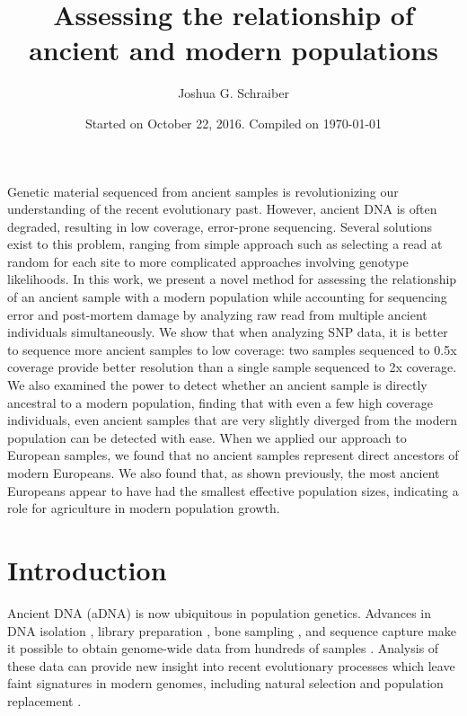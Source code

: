 \documentclass[11pt, oneside]{article}   	%
\title{Assessing the relationship of ancient and modern populations}
\author{Joshua G. Schraiber}
\date{Started on October 22, 2016. Compiled on \today}							%
\begin{document}
\maketitle

\abstract
Genetic material sequenced from ancient samples is revolutionizing our understanding of the recent evolutionary past. However, ancient DNA is often degraded, resulting in low coverage, error-prone sequencing. Several solutions exist to this problem, ranging from simple approach such as selecting a read at random for each site to more complicated approaches involving genotype likelihoods. In this work, we present a novel method for assessing the relationship of an ancient sample with a modern population while accounting for sequencing error and post-mortem damage by analyzing raw read from multiple ancient individuals simultaneously. We show that when analyzing SNP data, it is better to sequence more ancient samples to low coverage: two samples sequenced to 0.5x coverage provide better resolution than a single sample sequenced to 2x coverage. We also examined the power to detect whether an ancient sample is directly ancestral to a modern population, finding that with even a few high coverage individuals, even ancient samples that are very slightly diverged from the modern population can be detected with ease. When we applied our approach to European samples, we found that no ancient samples represent direct ancestors of modern Europeans. We also found that, as shown previously, the most ancient Europeans appear to have had the smallest effective population sizes, indicating a role for agriculture in modern population growth.

\section{Introduction}
Ancient DNA (aDNA) is now ubiquitous in population genetics. Advances in DNA isolation \citep{dabney2013ancient}, library preparation \citep{meyer2012high}, bone sampling \citep{pinhasi2015optimal}, and sequence capture \citep{haak2015massive} make it possible to obtain genome-wide data from hundreds of samples \citep{haak2015massive, mathieson2015genome, allentoft2015population, fu2016genetic}. Analysis of these data can provide new insight into recent evolutionary processes which leave faint signatures in modern genomes, including natural selection \citep{schraiber2016bayesian, jewett2016effects} and population replacement \citep{sjodin2014assessing, lazaridis2014ancient}. 
\end{document}
